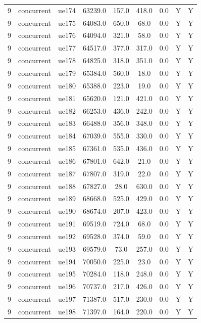 \begin{table}[ht]
\begin{tabular}{|c|c|c|c|c|c|c|c|c|}
9 & concurrent & ue174 & 63239.0 & 157.0 & 418.0 & 0.0 & Y & Y \\
9 & concurrent & ue175 & 64083.0 & 650.0 & 68.0 & 0.0 & Y & Y \\
9 & concurrent & ue176 & 64094.0 & 321.0 & 58.0 & 0.0 & Y & Y \\
9 & concurrent & ue177 & 64517.0 & 377.0 & 317.0 & 0.0 & Y & Y \\
9 & concurrent & ue178 & 64825.0 & 318.0 & 351.0 & 0.0 & Y & Y \\
9 & concurrent & ue179 & 65384.0 & 560.0 & 18.0 & 0.0 & Y & Y \\
9 & concurrent & ue180 & 65388.0 & 223.0 & 19.0 & 0.0 & Y & Y \\
9 & concurrent & ue181 & 65620.0 & 121.0 & 421.0 & 0.0 & Y & Y \\
9 & concurrent & ue182 & 66253.0 & 436.0 & 242.0 & 0.0 & Y & Y \\
9 & concurrent & ue183 & 66488.0 & 356.0 & 348.0 & 0.0 & Y & Y \\
9 & concurrent & ue184 & 67039.0 & 555.0 & 330.0 & 0.0 & Y & Y \\
9 & concurrent & ue185 & 67361.0 & 535.0 & 436.0 & 0.0 & Y & Y \\
9 & concurrent & ue186 & 67801.0 & 642.0 & 21.0 & 0.0 & Y & Y \\
9 & concurrent & ue187 & 67807.0 & 319.0 & 22.0 & 0.0 & Y & Y \\
9 & concurrent & ue188 & 67827.0 & 28.0 & 630.0 & 0.0 & Y & Y \\
9 & concurrent & ue189 & 68668.0 & 525.0 & 429.0 & 0.0 & Y & Y \\
9 & concurrent & ue190 & 68674.0 & 207.0 & 423.0 & 0.0 & Y & Y \\
9 & concurrent & ue191 & 69519.0 & 724.0 & 68.0 & 0.0 & Y & Y \\
9 & concurrent & ue192 & 69528.0 & 374.0 & 59.0 & 0.0 & Y & Y \\
9 & concurrent & ue193 & 69579.0 & 73.0 & 257.0 & 0.0 & Y & Y \\
9 & concurrent & ue194 & 70050.0 & 225.0 & 23.0 & 0.0 & Y & Y \\
9 & concurrent & ue195 & 70284.0 & 118.0 & 248.0 & 0.0 & Y & Y \\
9 & concurrent & ue196 & 70737.0 & 217.0 & 426.0 & 0.0 & Y & Y \\
9 & concurrent & ue197 & 71387.0 & 517.0 & 230.0 & 0.0 & Y & Y \\
9 & concurrent & ue198 & 71397.0 & 164.0 & 220.0 & 0.0 & Y & Y \\

\end{tabular}
\end{table}
